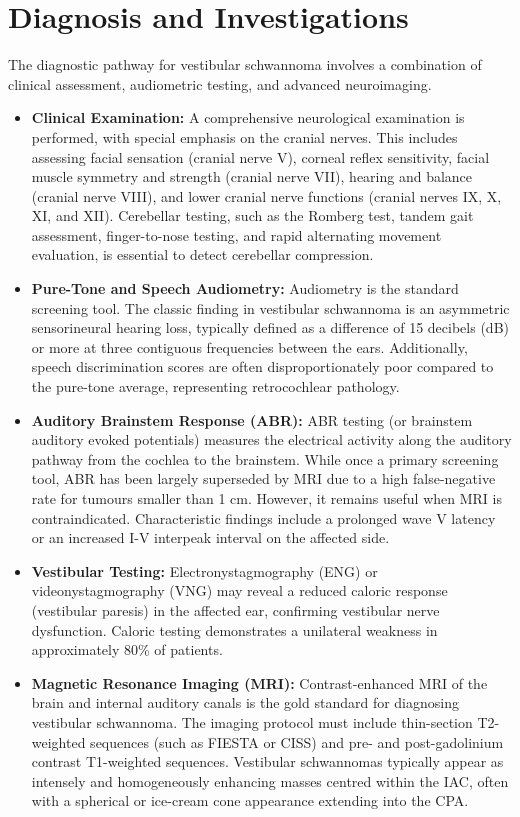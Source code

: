 \section*{Diagnosis and Investigations}
The diagnostic pathway for vestibular schwannoma involves a combination of clinical assessment, audiometric testing, and advanced neuroimaging.
\begin{itemize}
    \item \textbf{Clinical Examination:} A comprehensive neurological examination is performed, with special emphasis on the cranial nerves. This includes assessing facial sensation (cranial nerve V), corneal reflex sensitivity, facial muscle symmetry and strength (cranial nerve VII), hearing and balance (cranial nerve VIII), and lower cranial nerve functions (cranial nerves IX, X, XI, and XII). Cerebellar testing, such as the Romberg test, tandem gait assessment, finger-to-nose testing, and rapid alternating movement evaluation, is essential to detect cerebellar compression.
    \item \textbf{Pure-Tone and Speech Audiometry:} Audiometry is the standard screening tool. The classic finding in vestibular schwannoma is an asymmetric sensorineural hearing loss, typically defined as a difference of 15 decibels (dB) or more at three contiguous frequencies between the ears. Additionally, speech discrimination scores are often disproportionately poor compared to the pure-tone average, representing retrocochlear pathology.
    \item \textbf{Auditory Brainstem Response (ABR):} ABR testing (or brainstem auditory evoked potentials) measures the electrical activity along the auditory pathway from the cochlea to the brainstem. While once a primary screening tool, ABR has been largely superseded by MRI due to a high false-negative rate for tumours smaller than 1 cm. However, it remains useful when MRI is contraindicated. Characteristic findings include a prolonged wave V latency or an increased I-V interpeak interval on the affected side.
    \item \textbf{Vestibular Testing:} Electronystagmography (ENG) or videonystagmography (VNG) may reveal a reduced caloric response (vestibular paresis) in the affected ear, confirming vestibular nerve dysfunction. Caloric testing demonstrates a unilateral weakness in approximately 80\% of patients.
    \item \textbf{Magnetic Resonance Imaging (MRI):} Contrast-enhanced MRI of the brain and internal auditory canals is the gold standard for diagnosing vestibular schwannoma. The imaging protocol must include thin-section T2-weighted sequences (such as FIESTA or CISS) and pre- and post-gadolinium contrast T1-weighted sequences. Vestibular schwannomas typically appear as intensely and homogeneously enhancing masses centred within the IAC, often with a spherical or ice-cream cone appearance extending into the CPA.

\end{itemize}
